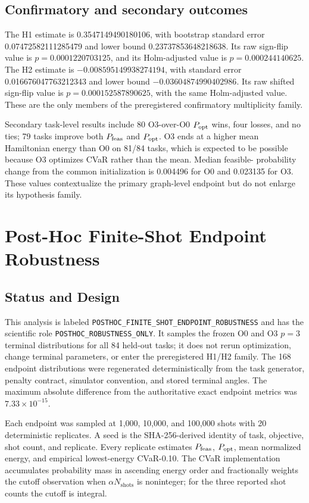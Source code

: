 \subsection{Confirmatory and secondary outcomes}

The H1 estimate is 0.3547149490180106, with bootstrap standard error
0.07472582111285479 and lower bound 0.23737853648218638. Its raw sign-flip
value is $p=0.0001220703125$, and its Holm-adjusted value is
$p=0.000244140625$. The H2 estimate is $-0.008595149938274194$, with standard
error 0.016676047763212343 and lower bound $-0.03604874990402986$. Its raw
shifted sign-flip value is $p=0.000152587890625$, with the same Holm-adjusted
value. These are the only members of the preregistered confirmatory
multiplicity family.

Secondary task-level results include 80 O3-over-O0 $P_{\mathrm{opt}}$ wins, four losses,
and no ties; 79 tasks improve both $P_{\mathrm{feas}}$ and $P_{\mathrm{opt}}$. O3 ends at a higher
mean Hamiltonian energy than O0 on 81/84 tasks, which is expected to be
possible because O3 optimizes CVaR rather than the mean. Median feasible-
probability change from the common initialization is 0.004496 for O0 and
0.023135 for O3. These values contextualize the primary graph-level endpoint
but do not enlarge its hypothesis family.

\section{Post-Hoc Finite-Shot Endpoint Robustness}
\label{app:finite-shot}

\subsection{Status and Design}
This analysis is labeled
\texttt{POSTHOC\_FINITE\_SHOT\_ENDPOINT\_ROBUSTNESS} and has the
scientific role \texttt{POSTHOC\_ROBUSTNESS\_ONLY}. It samples the frozen
O0 and O3 $p=3$ terminal distributions for all 84 held-out tasks; it does not
rerun optimization, change terminal parameters, or enter the preregistered
H1/H2 family. The 168 endpoint distributions were regenerated
deterministically from the task generator, penalty contract, simulator
convention, and stored terminal angles. The maximum absolute difference from
the authoritative exact endpoint metrics was
$7.33\times10^{-15}$.

Each endpoint was sampled at 1,000, 10,000, and 100,000 shots with 20
deterministic replicates. A seed is the SHA-256-derived identity of task,
objective, shot count, and replicate. Every replicate estimates $P_{\mathrm{feas}}$,
$P_{\mathrm{opt}}$, mean normalized energy, and empirical lowest-energy CVaR-0.10.
The CVaR implementation accumulates probability mass in ascending energy
order and fractionally weights the cutoff observation when
$\alpha N_{\mathrm{shots}}$ is noninteger; for the three reported shot
counts the cutoff is integral.

